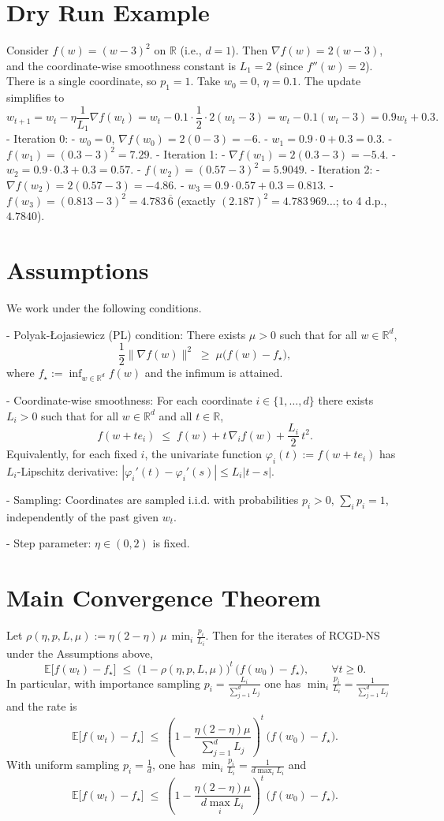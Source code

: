 \documentclass[11pt]{article}
\newcommand{\R}{\mathbb{R}}
\begin{document}
\section*{Dry Run Example}
Consider $f(w)=(w-3)^2$ on $\R$ (i.e., $d=1$). Then $\nabla f(w)=2(w-3)$, and the coordinate-wise smoothness constant is $L_1=2$ (since $f''(w)=2$). There is a single coordinate, so $p_1=1$. Take $w_0=0$, $\eta=0.1$. The update simplifies to
\[
w_{t+1}=w_t - \eta \frac{1}{L_1}\nabla f(w_t) = w_t - 0.1\cdot \frac{1}{2}\cdot 2(w_t-3)
= w_t - 0.1(w_t-3) = 0.9w_t + 0.3.
\]
- Iteration 0:
  - $w_0=0$, $\nabla f(w_0)=2(0-3)=-6$.
  - $w_1=0.9\cdot 0 + 0.3 = 0.3$.
  - $f(w_1)=(0.3-3)^2=7.29$.
- Iteration 1:
  - $\nabla f(w_1)=2(0.3-3)=-5.4$.
  - $w_2=0.9\cdot 0.3 + 0.3 = 0.57$.
  - $f(w_2)=(0.57-3)^2=5.9049$.
- Iteration 2:
  - $\nabla f(w_2)=2(0.57-3)=-4.86$.
  - $w_3=0.9\cdot 0.57 + 0.3 = 0.813$.
  - $f(w_3)=(0.813-3)^2=4.783\,\!  \overline{  6 }$ (exactly $(2.187)^2=4.783\,\!  969\dots$; to 4 d.p., $4.7840$).

\section*{Assumptions}
We work under the following conditions.

- Polyak-Łojasiewicz (PL) condition: There exists $\mu>0$ such that for all $w\in\R^d$,
\[
\frac{1}{2}\|\nabla f(w)\|^2 \;\ge\; \mu\bigl(f(w)-f_\star\bigr),
\]
where $f_\star := \inf_{w\in\R^d} f(w)$ and the infimum is attained.

- Coordinate-wise smoothness: For each coordinate $i\in\{1,\dots,d\}$ there exists $L_i>0$ such that for all $w\in\R^d$ and all $t\in\R$,
\[
f(w + t e_i) \;\le\; f(w) + t\,\nabla_i f(w) + \frac{L_i}{2}\,t^2.
\]
Equivalently, for each fixed $i$, the univariate function $\varphi_i(t):=f(w+te_i)$ has $L_i$-Lipschitz derivative: $|\varphi_i'(t)-\varphi_i'(s)|\le L_i|t-s|$.

- Sampling: Coordinates are sampled i.i.d. with probabilities $p_i>0$, $\sum_i p_i=1$, independently of the past given $w_t$.

- Step parameter: $\eta\in(0,2)$ is fixed.

\section*{Main Convergence Theorem}
Let $\rho(\eta,p,L,\mu):=\eta(2-\eta)\,\mu\,\min_{i}\frac{p_i}{L_i}$. Then for the iterates of RCGD-NS under the Assumptions above,
\[
\mathbb{E}\bigl[f(w_{t})-f_\star\bigr] \;\le\; \bigl(1-\rho(\eta,p,L,\mu)\bigr)^t\,\bigl(f(w_0)-f_\star\bigr),\qquad \forall t\ge 0.
\]
In particular, with importance sampling $p_i = \frac{L_i}{\sum_{j=1}^d L_j}$ one has $\min_i \frac{p_i}{L_i}=\frac{1}{\sum_{j=1}^d L_j}$ and the rate is
\[
\mathbb{E}\bigl[f(w_{t})-f_\star\bigr] \;\le\; \left(1-\frac{\eta(2-\eta)\mu}{\sum_{j=1}^d L_j}\right)^t\,\bigl(f(w_0)-f_\star\bigr).
\]
With uniform sampling $p_i=\tfrac{1}{d}$, one has $\min_i \frac{p_i}{L_i}=\frac{1}{d\max_i L_i}$ and
\[
\mathbb{E}\bigl[f(w_{t})-f_\star\bigr] \;\le\; \left(1-\frac{\eta(2-\eta)\mu}{d\max_i L_i}\right)^t\,\bigl(f(w_0)-f_\star\bigr).
\]
\end{document}

